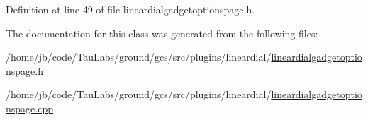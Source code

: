 \-Definition at line 49 of file lineardialgadgetoptionspage.\-h.



\-The documentation for this class was generated from the following files\-:\begin{DoxyCompactItemize}
\item 
/home/jb/code/\-Tau\-Labs/ground/gcs/src/plugins/lineardial/\hyperlink{lineardialgadgetoptionspage_8h}{lineardialgadgetoptionspage.\-h}\item 
/home/jb/code/\-Tau\-Labs/ground/gcs/src/plugins/lineardial/\hyperlink{lineardialgadgetoptionspage_8cpp}{lineardialgadgetoptionspage.\-cpp}\end{DoxyCompactItemize}
